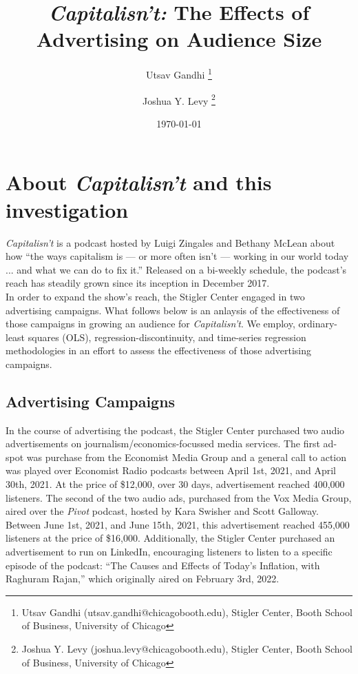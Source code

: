 \documentclass[11pt, letterpaper, twoside]{article}
\title{\singlespacing\textbf{\textit{Capitalisn't:} The Effects of Advertising on Audience Size}}
\author{Utsav Gandhi \thanks{Utsav Gandhi (utsav.gandhi@chicagobooth.edu), Stigler Center, Booth School of Business, University of Chicago}
    \and 
    Joshua Y. Levy \thanks{Joshua Y. Levy  (joshua.levy@chicagobooth.edu), Stigler Center, Booth School of Business, University of Chicago}}
\date{\today}
\begin{document}
\begin{titlepage}
    \maketitle
    \thispagestyle{empty}
\end{titlepage}


\newpage
{}


% 


\section{About \textit{Capitalisn't} and this investigation}
\textit{Capitalisn't} is a podcast hosted by Luigi Zingales and Bethany McLean about how ``the ways capitalism is --- or more often isn't --- working in our world today ... and what we can do to fix it.'' Released on a bi-weekly schedule, the podcast's reach has steadily grown since its inception in December 2017.\\

In order to expand the show's reach, the Stigler Center engaged in two advertising campaigns. What follows below is an anlaysis of the effectiveness of those campaigns in growing an audience for \textit{Capitalisn't}. We employ, ordinary-least squares (OLS), regression-discontinuity, and time-series regression methodologies in an effort to assess the effectiveness of those advertising campaigns.


\subsection{Advertising Campaigns}
In the course of advertising the podcast, the Stigler Center purchased two audio advertisements on journalism/economics-focussed media services. The first ad-spot was purchase from the Economist Media Group and a general call to action was played over Economist Radio podcasts between April 1st, 2021, and April 30th, 2021. At the price of \$12,000, over 30 days, advertisement reached 400,000 listeners. The second of the two audio ads, purchased from the Vox Media Group, aired over the \textit{Pivot} podcast, hosted by Kara Swisher and Scott Galloway. Between June 1st, 2021, and June 15th, 2021, this advertisement reached 455,000 listeners at the price of \$16,000. Additionally, the Stigler Center purchased an advertisement to run on LinkedIn, encouraging listeners to listen to a specific episode of the podcast: ``The Causes and Effects of Today's Inflation, with Raghuram Rajan,'' which originally aired on February 3rd, 2022.\\
\end{document}
